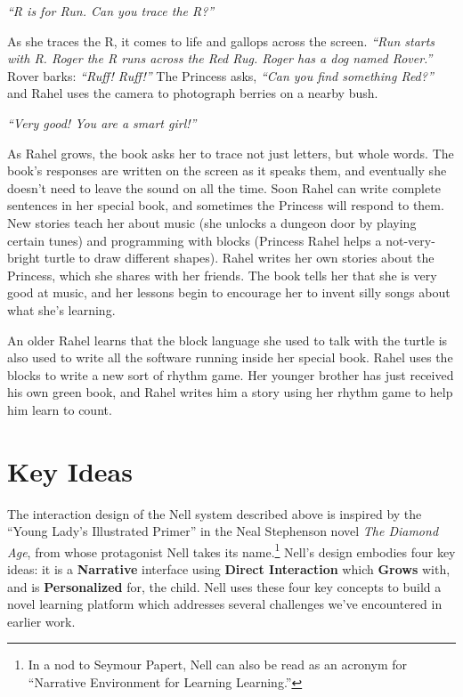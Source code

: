 \documentclass[preprint]{sig-alternate}
\begin{document}
\textit{``R is for Run.  Can you trace the R?''}

As she traces the R, it comes to life and gallops across the screen.
\textit{``Run starts with R.  Roger the R runs across the Red Rug.
Roger has a dog named Rover.''}  Rover barks: \textit{``Ruff! Ruff!''}  The
Princess asks, \textit{``Can you find something Red?''} and Rahel uses the
camera to photograph berries on a nearby bush.

\textit{``Very good!  You are a smart girl!''}

As Rahel grows, the book asks her to trace not just letters, but whole
words.  The book's responses are written on the screen as it speaks
them, and eventually she doesn't need to leave the sound on all the
time.  Soon Rahel can write complete sentences in her special book,
and sometimes the Princess will respond to them.  New stories teach her about
music (she unlocks a dungeon door by playing certain tunes) and
programming with blocks (Princess Rahel helps a not-very-bright turtle
to draw different shapes).  Rahel writes her own stories about the Princess,
which she shares with her friends.  The book tells her that she is
very good at music, and her lessons begin to encourage her to invent
silly songs about what she's learning.

An older Rahel learns that the block language she used to talk with
the turtle is also used to write all the software running inside
her special book.  Rahel uses the blocks to write a new sort of rhythm
game.  Her younger brother has just received his own green book,
and Rahel writes him a story using her rhythm game to help him learn
to count.

\section{Key Ideas}
The interaction design of the Nell system described above is inspired
by the ``Young Lady's Illustrated Primer'' in the Neal Stephenson
novel \textit{The Diamond Age}, from whose protagonist Nell takes its
name.\footnote{In a nod to Seymour Papert, Nell can also be read as an
acronym for ``Narrative Environment for Learning Learning.''}
Nell's design embodies four key ideas: it is a \textbf{Narrative}
interface using \textbf{Direct Interaction} which \textbf{Grows} with,
and is \textbf{Personalized} for, the child.
Nell uses these four key concepts to build a novel learning platform
which addresses several challenges we've encountered in earlier work.
\end{document}
